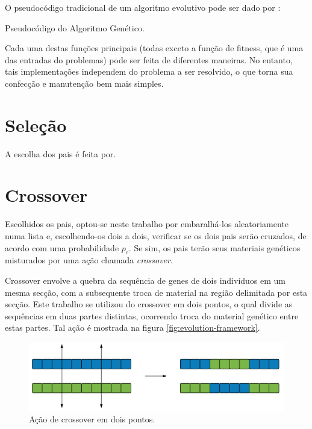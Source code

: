 \label{3_algoritmo_genetico}

O pseudocódigo tradicional de um algoritmo evolutivo pode ser dado por \cite{algoritmopseudo}:

\begin{algorithm}[H]
\caption{Pseudocódigo do Algoritmo Genético.}
\label{alg:ag}
\end{algorithm}

Cada uma destas funções principais (todas exceto a função de fitness, que é uma das entradas do problemas) pode ser feita de diferentes maneiras. No entanto, tais implementações independem do problema a ser resolvido, o que torna sua confecção e manutenção bem mais simples.

\section{Seleção}

A escolha dos pais é feita por.

\section{Crossover}

Escolhidos os pais, optou-se neste trabalho por embaralhá-los aleatoriamente numa lista e, escolhendo-os dois a dois, verificar se os dois pais serão cruzados, de acordo com uma probabilidade $p_c$. Se sim, os pais terão seus materiais genéticos misturados por uma ação chamada \emph{crossover}.

Crossover envolve a quebra da sequência de genes de dois indivíduos em um mesma secção, com a subsequente troca de material na região delimitada por esta secção. Este trabalho se utilizou do crossover em dois pontos, o qual divide as sequências em duas partes distintas, ocorrendo troca do material genético entre estas partes. Tal ação é mostrada na figura \ref{fig:evolution-framework}.

\begin{figure}[ht!]
    \centering \includegraphics[width=1.0\textwidth]{crossover.png}
    \caption{Ação de crossover em dois pontos.}
    \label{fig:crossover}
\end{figure}

